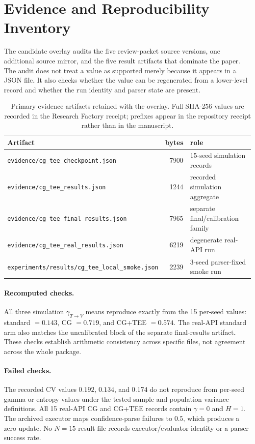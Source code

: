 \section{Evidence and Reproducibility Inventory}\label{sec:evidenceinventory}

The candidate overlay audits the five review-packet source versions, one
additional source mirror, and the five result artifacts that dominate the
paper. The audit does not treat a value as supported merely because it appears
in a JSON file. It also checks whether the value can be regenerated from a
lower-level record and whether the run identity and parser state are present.

\begin{table}[ht]\centering\small
\caption{Primary evidence artifacts retained with the overlay. Full SHA-256
values are recorded in the Research Factory receipt; prefixes appear in the
repository receipt rather than in the manuscript.}
\label{tab:artifactinventory}
\begin{tabular}{p{5.6cm} r p{4.4cm}}\toprule
Artifact & bytes & role \\\midrule
\texttt{evidence/cg\_tee\_checkpoint.json} & 7900 & 15-seed simulation records \\
\texttt{evidence/cg\_tee\_results.json} & 1244 & recorded simulation aggregate \\
\texttt{evidence/cg\_tee\_final\_results.json} & 7965 & separate final/calibration family \\
\texttt{evidence/cg\_tee\_real\_results.json} & 6219 & degenerate real-API run \\
\texttt{experiments/results/cg\_tee\_local\_smoke.json} & 2239 & 3-seed parser-fixed smoke run \\
\bottomrule\end{tabular}\end{table}

\paragraph{Recomputed checks.}
All three simulation $\gamma_{T\to V}$ means reproduce exactly from the 15
per-seed values: standard $=0.143$, CG $=0.719$, and CG+TEE $=0.574$.
The real-API standard arm also matches the uncalibrated block of the separate
final-results artifact. These checks establish arithmetic consistency across
specific files, not agreement across the whole package.

\paragraph{Failed checks.}
The recorded CV values $0.192$, $0.134$, and $0.174$ do not reproduce from
per-seed gamma or entropy values under the tested sample and population
variance definitions. All 15 real-API CG and CG+TEE records contain $\gamma=0$
and $H=1$. The archived executor maps confidence-parse failures to $0.5$, which
produces a zero update. No $N{=}15$ result file records executor/evaluator
identity or a parser-success rate.

